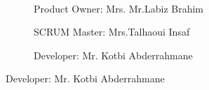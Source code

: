 \begin{frame}[fragile=singleslide]{\insertsectionhead}
  \framesubtitle{\insertsubsectionhead}
  \begin{figure}[ht!]
    \begin{subfigure}[b]{0.3\textwidth}
      \caption*{Product Owner: Mrs. Mr.Labiz Brahim}
    \end{subfigure}
    \hspace{\fill}
    \begin{subfigure}[b]{0.3\textwidth}
      \caption*{SCRUM Master: Mrs.Talhaoui Insaf}
    \end{subfigure}
    \hspace{\fill}
    \begin{subfigure}[b]{0.3\textwidth}
      \caption*{Developer: Mr. Kotbi Abderrahmane}
    \end{subfigure}
  \end{figure}
\end{frame}

